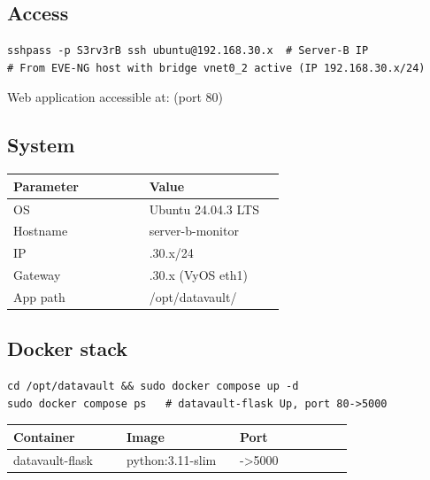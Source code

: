 \subsection{Access}

\begin{lstlisting}
sshpass -p S3rv3rB ssh ubuntu@192.168.30.x  # Server-B IP
# From EVE-NG host with bridge vnet0_2 active (IP 192.168.30.x/24)
\end{lstlisting}

Web application accessible at:  (port 80)

\subsection{System}

{\footnotesize\begin{longtable}[]{@{}>{\raggedright\arraybackslash}p{0.45\linewidth}
  >{\raggedright\arraybackslash}p{0.45\linewidth}@{}}
\toprule\noalign{}
Parameter & Value \\
\midrule\noalign{}
\endhead
\bottomrule\noalign{}
\endlastfoot
OS & Ubuntu 24.04.3 LTS \\
Hostname & server-b-monitor \\
IP & 192.168.30.x/24 \\
Gateway & 192.168.30.x (VyOS eth1) \\
App path & /opt/datavault/ \\
\end{longtable}}

\subsection{Docker stack}

\begin{lstlisting}
cd /opt/datavault && sudo docker compose up -d
sudo docker compose ps   # datavault-flask Up, port 80->5000
\end{lstlisting}

{\footnotesize\begin{longtable}[]{@{}>{\raggedright\arraybackslash}p{0.30\linewidth}
  >{\raggedright\arraybackslash}p{0.30\linewidth}
  >{\raggedright\arraybackslash}p{0.30\linewidth}@{}}
\toprule\noalign{}
Container & Image & Port \\
\midrule\noalign{}
\endhead
\bottomrule\noalign{}
\endlastfoot
datavault-flask & python:3.11-slim & 80-\textgreater5000 \\
\end{longtable}}

